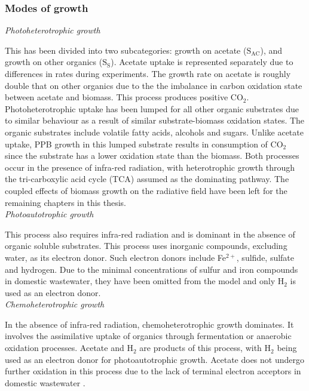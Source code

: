 \subsubsection{Modes of growth}
\noindent\textit{Photoheterotrophic growth}\par
\noindent This has been divided into two subcategories: growth on acetate ($\mathrm{S_{AC}}$), and growth on other organics ($\mathrm{S_S}$). Acetate uptake is represented separately due to differences in rates during experiments. The growth rate on acetate is roughly double that on other organics due to the the imbalance in carbon oxidation state between acetate and biomass. This process produces positive $\mathrm{CO_2}$. Photoheterotrophic uptake has been lumped for all other organic substrates due to similar behaviour as a result of similar substrate-biomass oxidation states. The organic substrates include volatile fatty acids, alcohols and sugars. Unlike acetate uptake, PPB growth in this lumped substrate results in consumption of $\mathrm{CO_2}$ since the substrate has a lower oxidation state than the biomass. Both processes occur in the presence of infra-red radiation, with heterotrophic growth through the tri-carboxylic acid cycle (TCA) assumed as the dominating pathway. The coupled effects of biomass growth on the radiative field have been left for the remaining chapters in this thesis. \\

\noindent\textit{Photoautotrophic growth}\par
\noindent This process also requires infra-red radiation and is dominant in the absence of organic soluble substrates. This process uses inorganic compounds, excluding water, as its electron donor. Such electron donors include Fe$^{2+}$, sulfide, sulfate and hydrogen. Due to the minimal concentrations of sulfur and iron compounds in domestic wastewater, they have been omitted from the model and only $\mathrm{H_2}$ is used as an electron donor. \\

\noindent\textit{Chemoheterotrophic growth}\par
\noindent In the absence of infra-red radiation, chemoheterotrophic growth dominates. It involves the assimilative uptake of organics through fermentation or anaerobic oxidation processes. Acetate and $\mathrm{H_2}$ are products of this process, with $\mathrm{H_2}$ being used as an electron donor for photoautotrophic growth. Acetate does not undergo further oxidation in this process due to the lack of terminal electron acceptors in domestic wastewater \cite{finneran2003}.\\

